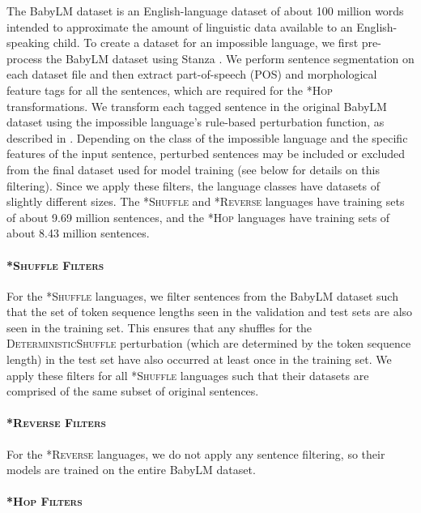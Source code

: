 \documentclass[11pt]{article}
\begin{document}
The BabyLM dataset \cite{warstadt2023papers} is an English-language dataset of 
about 100 million words intended to approximate the 
amount of linguistic data available to an English-speaking child. 
To create a dataset for an impossible language, we first pre-process the BabyLM dataset using Stanza \cite{qi2020stanza}. We perform sentence segmentation on each dataset file and then extract part-of-speech (POS) and morphological feature tags for all the sentences, which are required for the \textsc{*Hop} transformations. We transform each tagged sentence in the original BabyLM dataset using the impossible language's rule-based perturbation function, as described in . 
Depending on the class of the impossible language and the specific features of the input sentence, perturbed sentences may be included or excluded from the final dataset used for model training (see below %
for details on this filtering). Since we apply these filters, the language classes have datasets of slightly different sizes. The \textsc{*Shuffle} and \textsc{*Reverse} languages have training sets of about 9.69 million sentences, and the \textsc{*Hop} languages have training sets of about 8.43 million sentences.

\paragraph{\textsc{*Shuffle Filters}}
For the \textsc{*Shuffle} languages, we filter sentences from the BabyLM dataset such that the set of token sequence lengths seen in the validation and test sets are also seen in the training set. This ensures that any shuffles for the \textsc{DeterministicShuffle} perturbation (which are determined by the token sequence length) in the test set have also occurred at least once in the training set. We apply these filters for all \textsc{*Shuffle} languages such that their datasets are comprised of the same subset of original sentences.

\paragraph{\textsc{*Reverse Filters}}
For the \textsc{*Reverse} languages, we do not apply any sentence filtering, so their models are trained on the entire BabyLM dataset.

\paragraph{\textsc{*Hop Filters}}
\end{document}
